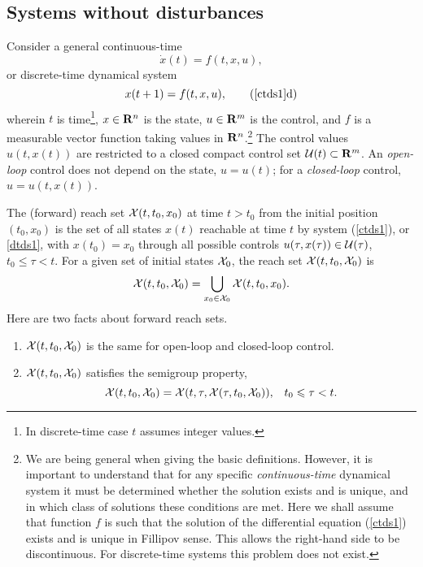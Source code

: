 \subsection{Systems without disturbances}\label{subsec_sysnodist}
Consider a general continuous-time
\begin{equation}
\dot{x}(t) = f(t, x, u),
\label{ctds1}
\end{equation}
or discrete-time dynamical system
\begin{equation}
x(t+1) = f(t, x, u),
\tag*{(\ref{ctds1}d)}
\label{dtds1}
\end{equation}
wherein $t$ is time\footnote{In discrete-time case $t$ assumes integer values.},
$x\in{\bf R}^n$ is the state, $u\in{\bf R}^m$ is the control,
and $f$ is a measurable vector function taking values in
${\bf R}^n$.\footnote{We are being general when giving the basic definitions.
However, it is  important to understand that for any specific
\emph{continuous-time} dynamical system it must be determined whether
the solution exists and is unique, and in which class of solutions
these conditions are met.
Here we shall assume that function $f$ is such that the solution of the differential equation (\ref{ctds1})
exists and is unique in Fillipov sense.
This allows the right-hand side to be discontinuous.
For discrete-time systems this problem does not exist.}
The control values $u(t, x(t))$ are restricted
to a closed compact control set $\UU(t)\subset{\bf R}^m$.
An \emph{open-loop} control does not depend on the state, $u=u(t)$; for a \emph{closed-loop} control, $u=u(t, x(t))$.

The (forward) reach set $\XX(t, t_0, x_0)$ at time $t>t_0$ from the initial position
$(t_0, x_0)$ is the set of all states $x(t)$ reachable at time $t$ by
system (\ref{ctds1}), or \ref{dtds1}, with $x(t_0)=x_0$
through all possible controls
$u(\tau, x(\tau))\in\UU(\tau)$, $t_0\leq\tau< t$.
For a given set of initial states $\XX_0$, the reach set $\XX(t, t_0, \XX_0)$ is
\[ \XX(t, t_0, \XX_0) = \bigcup_{x_0\in\XX_0}\XX(t, t_0, x_0). \]
\label{def_olrs}
\ed
Here are two facts about forward reach sets.
\begin{enumerate}

\item  $\XX(t, t_0, \XX_0)$ is the same for open-loop and closed-loop control.

\item  $\XX(t, t_0, \XX_0)$ satisfies the semigroup property,
\begin{equation}
\XX(t, t_0, \XX_0) = \XX(t, \tau, \XX(\tau, t_0, \XX_0)), \;\;\;
t_0\leq \tau< t.
\label{semigroup}
\end{equation}
\end{enumerate}

